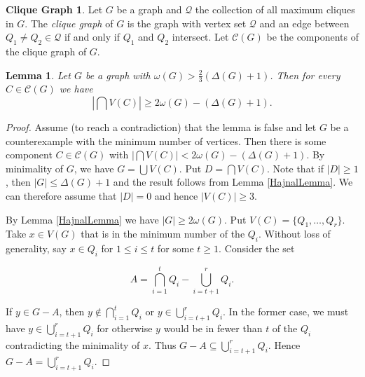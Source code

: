 \documentclass[12pt]{article}
\theoremstyle{plain}
\newtheorem{lem}[thm]{Lemma}
\theoremstyle{definition}
\newtheorem*{CliqueGraph}{Clique Graph}
\theoremstyle{remark}
\begin{document}
\begin{CliqueGraph}
Let $G$ be a graph and $\mathcal{Q}$ the collection of all maximum cliques in $G$.  The \emph{clique graph} of $G$ is the graph with vertex set $\mathcal{Q}$ and an edge between $Q_1 \neq Q_2 \in \mathcal{Q}$ if and only if $Q_1$ and $Q_2$ intersect.  Let $\mathcal{C}(G)$ be the components of the clique graph of $G$.
\end{CliqueGraph}

\begin{lem}\label{KostochkaLemma}
Let $G$ be a graph with $\omega(G) > \frac{2}{3}(\Delta(G) + 1)$.  Then for every $C \in \mathcal{C}(G)$ we have 
\[\left | \bigcap V(C) \right | \geq 2\omega(G) - (\Delta(G) + 1).\]
\end{lem}
\begin{proof}
Assume (to reach a contradiction) that the lemma is false and let $G$ be a counterexample with the minimum number of vertices.  Then there is some component $C \in \mathcal{C}(G)$ with $\left | \bigcap V(C) \right | < 2\omega(G) - (\Delta(G) + 1)$.  By minimality of $G$, we have $G = \bigcup V(C)$.  Put $D = \bigcap V(C)$.  Note that if $|D| \geq 1$, then $|G| \leq \Delta(G) + 1$ and the result follows from Lemma \ref{HajnalLemma}.  We can therefore assume that $|D| = 0$ and hence $|V(C)| \geq 3$.\newline

By Lemma \ref{HajnalLemma} we have $|G| \geq 2\omega(G)$.  Put $V(C) = \{Q_1, \ldots, Q_r\}$.  Take $x \in V(G)$ that is in the minimum number of the $Q_i$.  Without loss of generality, say $x \in Q_i$ for $1 \leq i \leq t$ for some $t \geq 1$.  Consider the set

\[A = \displaystyle \bigcap_{i=1}^t Q_i - \bigcup_{i = t + 1}^r Q_i.\]

If $y \in G-A$, then $y \not \in \displaystyle \bigcap_{i=1}^t Q_i$ or $y \in \displaystyle \bigcup_{i = t + 1}^r Q_i$.  In the former case, we must have $y \in \displaystyle \bigcup_{i = t + 1}^r Q_i$ for otherwise $y$ would be in fewer than $t$ of the $Q_i$ contradicting the minimality of $x$.  Thus $G-A \subseteq \displaystyle\bigcup_{i = t + 1}^r Q_i$. Hence $G-A = \displaystyle\bigcup_{i = t + 1}^r Q_i$.\newline


\end{proof}
\end{document}
